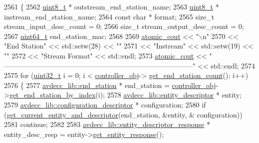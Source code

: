 \begin{DoxyCode}
2561 \{
2562     \hyperlink{stdint_8h_aba7bc1797add20fe3efdf37ced1182c5}{uint8\_t} * outstream\_end\_station\_name;
2563     \hyperlink{stdint_8h_aba7bc1797add20fe3efdf37ced1182c5}{uint8\_t} * instream\_end\_station\_name;
2564     \textcolor{keyword}{const} \textcolor{keywordtype}{char} * format;
2565     \textcolor{keywordtype}{size\_t} stream\_input\_desc\_count = 0;
2566     \textcolor{keywordtype}{size\_t} stream\_output\_desc\_count = 0;
2567     \hyperlink{parse_8c_aec6fcb673ff035718c238c8c9d544c47}{uint64\_t} end\_station\_mac;
2568 
2569     \hyperlink{cmd__line_8h_a0bc38ccc65c79ba06c6fcd7b4bf554c3}{atomic\_cout} << \textcolor{stringliteral}{"\(\backslash\)n"}
2570                 << \textcolor{stringliteral}{"End Station"} << std::setw(28) << \textcolor{stringliteral}{""}
2571                 << \textcolor{stringliteral}{"Instream"} << std::setw(19) << \textcolor{stringliteral}{""}
2572                 << \textcolor{stringliteral}{"Stream Format"} << std::endl;
2573     \hyperlink{cmd__line_8h_a0bc38ccc65c79ba06c6fcd7b4bf554c3}{atomic\_cout} << \textcolor{stringliteral}{"
      ---------------------------------------------------------------------------------"} << std::endl;
2574 
2575     \textcolor{keywordflow}{for} (\hyperlink{parse_8c_a6eb1e68cc391dd753bc8ce896dbb8315}{uint32\_t} i = 0; i < \hyperlink{classcmd__line_af0a7784509e5bf1210a2aa19cea5df70}{controller\_obj}->
      \hyperlink{classavdecc__lib_1_1controller_ab5ddf7b4a9718fe3e821289141f44485}{get\_end\_station\_count}(); i++)
2576     \{
2577         \hyperlink{classavdecc__lib_1_1end__station}{avdecc\_lib::end\_station} * end\_station = 
      \hyperlink{classcmd__line_af0a7784509e5bf1210a2aa19cea5df70}{controller\_obj}->\hyperlink{classavdecc__lib_1_1controller_a2a8ec1205ea0d5fdd6f833285257d0d0}{get\_end\_station\_by\_index}(i);
2578         \hyperlink{classavdecc__lib_1_1entity__descriptor}{avdecc\_lib::entity\_descriptor} * entity;
2579         \hyperlink{classavdecc__lib_1_1configuration__descriptor}{avdecc\_lib::configuration\_descriptor} * configuration;
2580         \textcolor{keywordflow}{if} (\hyperlink{classcmd__line_aa22ed7f036749918eb875043f10060c9}{get\_current\_entity\_and\_descriptor}(end\_station, &entity, &
      configuration))
2581             \textcolor{keywordflow}{continue};
2582 
2583         \hyperlink{classavdecc__lib_1_1entity__descriptor__response}{avdecc\_lib::entity\_descriptor\_response} * entity\_desc\_resp = 
      entity->\hyperlink{classavdecc__lib_1_1entity__descriptor_ac31dd117f0c931ae93c8ba52df7211bd}{get\_entity\_response}();

\end{DoxyCode}

